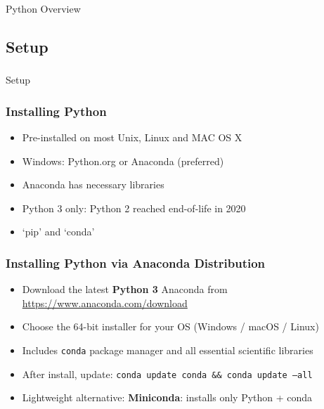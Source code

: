 \begin{frame}[fragile]\frametitle{}
\begin{center}
{\Large Python Overview}
\end{center}
\end{frame}

\subsection{Setup}
\begin{frame}[fragile]\frametitle{}
\begin{center}
{\Large Setup}
\end{center}
\end{frame}

\begin{frame}[fragile]\frametitle{Installing Python}
  \begin{itemize}
  \item Pre-installed on most Unix, Linux and MAC OS X
   \item Windows: Python.org or Anaconda (preferred)
   \item Anaconda has necessary libraries
\item Python 3 only: Python 2 reached end-of-life in 2020
\item `pip' and `conda'
  \end{itemize}
\end{frame}

\begin{frame}[fragile]\frametitle{Installing Python via Anaconda Distribution}
  \begin{itemize}
  \item Download the latest \textbf{Python 3} Anaconda from \url{https://www.anaconda.com/download}
  \item Choose the 64-bit installer for your OS (Windows / macOS / Linux)
  \item Includes \texttt{conda} package manager and all essential scientific libraries
  \item After install, update: \texttt{conda update conda \&\& conda update --all}
  \item Lightweight alternative: \textbf{Miniconda}: installs only Python + conda
  \end{itemize}
\end{frame}

